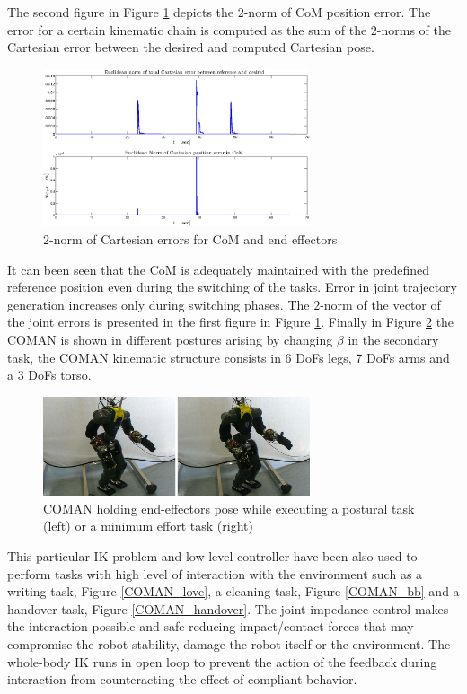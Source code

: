 The second figure in Figure \ref{CoM_error} depicts the $2$-norm of CoM position error. The error for a certain kinematic chain is computed as the sum of the $2$-norms of the Cartesian error between the desired and computed Cartesian pose.
\begin{figure}
    \centering
    \includegraphics[width=0.7\textwidth]{images/soft_interaction/CartesianErrors}
    \caption{$2$-norm of Cartesian errors for CoM and end effectors}\label{CoM_error}
\end{figure}
It can been seen that the CoM is adequately maintained with the predefined reference position even during the switching of the tasks. 
Error in joint trajectory generation increases only during switching phases. The $2$-norm of the vector of the joint errors is presented in the first figure in Figure \ref{CoM_error}.
Finally in Figure \ref{COMAN_exp} the COMAN is shown in different postures arising by changing $\beta$ in the secondary task, the COMAN kinematic structure consists in 6 DoFs legs, 7 DoFs arms and a 3 DoFs torso.
\begin{figure}
        \centering
        \vspace{2mm}
        \includegraphics[width=0.7\textwidth]{images/soft_interaction/postural_min_effort.png}
        \caption{COMAN holding end-effectors pose while executing a postural task (left) or a minimum effort task (right)}
        \label{COMAN_exp}
\end{figure}
This particular IK problem and low-level controller have been also used to perform tasks with high level of interaction with the environment such as a writing task, Figure \ref{COMAN_love}, a cleaning task, Figure \ref{COMAN_bb} and a handover task, Figure \ref{COMAN_handover}. The joint impedance control makes the interaction possible and safe reducing impact/contact forces that may compromise the robot stability, damage the robot itself or the environment. The whole-body IK runs in open loop to prevent the action of the feedback during interaction from counteracting the effect of compliant behavior.

